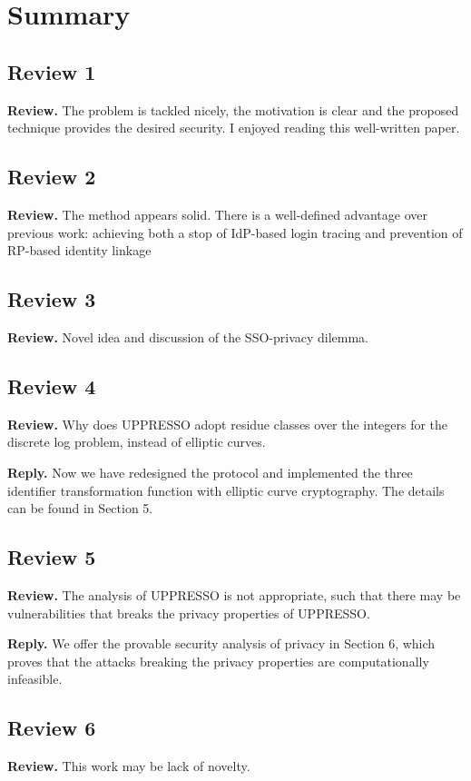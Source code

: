 \documentclass[letterpaper,onecolumn,10pt]{article}
\begin{document}
\section{Summary}
\subsection{Review 1}
\noindent\textbf{Review.} The problem is tackled nicely, the motivation is clear and the proposed technique provides the desired security. I enjoyed reading this well-written paper. 

\subsection{Review 2}
\noindent\textbf{Review.}  The method appears solid. 
There is a well-defined advantage over previous work: achieving both a stop of  IdP-based login tracing and prevention of RP-based identity linkage

\subsection{Review 3}
\noindent\textbf{Review.} Novel idea and discussion of the SSO-privacy dilemma.

\subsection{Review 4}
\noindent\textbf{Review.} Why does UPPRESSO adopt residue classes over the integers for the discrete log problem, instead of elliptic curves.

\noindent\textbf{Reply.} Now we have redesigned the protocol and implemented the three identifier transformation function with elliptic curve cryptography. The details can be found in Section 5.

\subsection{Review 5}
\noindent\textbf{Review.}  The analysis of UPPRESSO is not appropriate, such that there may be vulnerabilities that breaks the privacy properties of UPPRESSO. 

\noindent\textbf{Reply.} We offer the provable security analysis of privacy  in Section 6, which proves that the attacks breaking the privacy properties are computationally infeasible.

\subsection{Review 6}
\noindent\textbf{Review.}  This work may be lack of novelty. 
\end{document}
